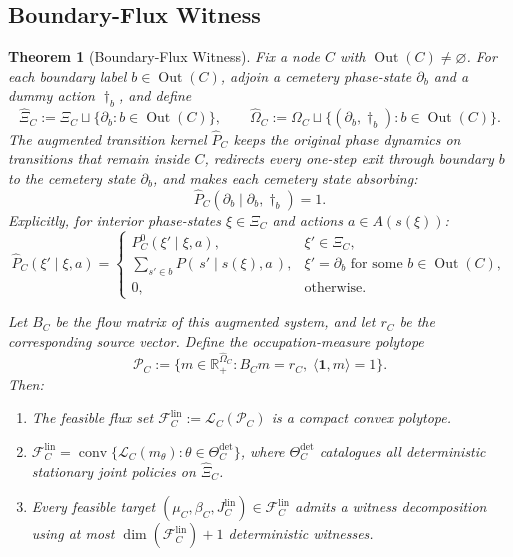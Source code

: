 \documentclass[12pt,a4paper]{article}
\newtheorem{theorem}{Theorem}[section]
\theoremstyle{definition}
\newcommand{\R}{\mathbb{R}}
\DeclareMathOperator{\conv}{conv}
\DeclareMathOperator{\Out}{Out}
\begin{document}
\subsection{Boundary-Flux Witness}

\begin{theorem}[Boundary-Flux Witness]\label{thm:flux-witness}
Fix a node $C$ with $\Out(C) \neq \varnothing$.  For each boundary label $b \in \Out(C)$, adjoin a cemetery phase-state $\partial_b$ and a dummy action $\dagger_b$, and define
\[
\hat\Xi_C := \Xi_C \sqcup \{\partial_b : b \in \Out(C)\},
\qquad
\hat\Omega_C := \Omega_C \sqcup \{(\partial_b, \dagger_b) : b \in \Out(C)\}.
\]
The augmented transition kernel $\hat P_C$ keeps the original phase dynamics on transitions that remain inside $C$, redirects every one-step exit through boundary $b$ to the cemetery state $\partial_b$, and makes each cemetery state absorbing:
\[
\hat P_C(\partial_b \mid \partial_b, \dagger_b) = 1.
\]
Explicitly, for interior phase-states $\xi \in \Xi_C$ and actions $a \in A(s(\xi))$:
\[
\hat P_C(\xi' \mid \xi, a) =
\begin{cases}
P_C^0(\xi' \mid \xi, a), & \xi' \in \Xi_C, \\
\sum_{s' \in b} P(\,s' \mid s(\xi), a\,), & \xi' = \partial_b \text{ for some } b \in \Out(C), \\
0, & \text{otherwise}.
\end{cases}
\]

Let $B_C$ be the flow matrix of this augmented system, and let $r_C$ be the corresponding source vector. Define the occupation-measure polytope
\[
\mathcal{P}_C := \bigl\{m \in \R_+^{\hat\Omega_C} : B_C m = r_C,\; \langle \mathbf{1}, m \rangle = 1\bigr\}.
\]
Then:
\begin{enumerate}
\item The feasible flux set $\mathcal{F}_C^{\mathrm{lin}} := \mathcal{L}_C(\mathcal{P}_C)$ is a compact convex polytope.
\item $\mathcal{F}_C^{\mathrm{lin}} = \conv\{\mathcal{L}_C(m_\theta) : \theta \in \Theta_C^{\det}\}$, where $\Theta_C^{\det}$ catalogues all deterministic stationary joint policies on $\hat\Xi_C$.
\item Every feasible target $(\mu_C, \beta_C, J_C^{\mathrm{lin}}) \in \mathcal{F}_C^{\mathrm{lin}}$ admits a witness decomposition using at most $\dim(\mathcal{F}_C^{\mathrm{lin}}) + 1$ deterministic witnesses.
\end{enumerate}
\end{theorem}
\end{document}

